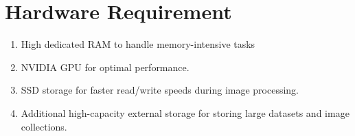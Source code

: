 \section{Hardware Requirement}
\begin{enumerate}[noitemsep] %
   \item High dedicated RAM to handle memory-intensive tasks
   \item NVIDIA GPU for optimal performance.
   \item  SSD storage for faster read/write speeds during image processing.
   \item Additional high-capacity external storage for storing large datasets and image collections.
\end{enumerate}
